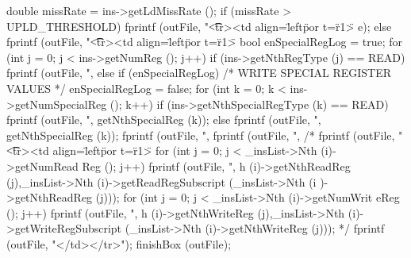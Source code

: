 \begin{DoxyCode}
{{{                        double missRate = ins->getLdMissRate ();
                        if (missRate > UPLD_THRESHOLD)
                                fprintf (outFile, "\t\t<tr><td align=\"left\" por
      t=\"r1\"> %
      e);
                        else {
                                fprintf (outFile, "\t\t<tr><td align=\"left\" por
      t=\"r1\"> %
                bool enSpecialRegLog = true;
                for (int j = 0; j < ins->getNumReg (); j++) {
                    if (ins->getNthRegType (j) == READ) {
                        fprintf (outFile, ",%
                    } else {
                        if (enSpecialRegLog) {
                            /* WRITE SPECIAL REGISTER VALUES */
                            enSpecialRegLog = false;
                            for (int k = 0; k < ins->getNumSpecialReg (); k++) {
                                if (ins->getNthSpecialRegType (k) == READ) {
                                    fprintf (outFile, ",%
      getNthSpecialReg (k));
                                } else {
                                    fprintf (outFile, ",%
      getNthSpecialReg (k));
                                }
                            }
                        }
                        fprintf (outFile, ",%
                    }
                }
                                fprintf (outFile, ",%
/*                              fprintf (outFile, "\t\t<tr><td align=\"left\" por
      t=\"r1\"> %
                                for (int j = 0; j < _insList->Nth (i)->getNumRead
      Reg (); j++) {
                                        fprintf (outFile, ",%
      h (i)->getNthReadReg (j),_insList->Nth (i)->getReadRegSubscript (_insList->Nth (i
      )->getNthReadReg (j)));                         
                                }
                                for (int j = 0; j < _insList->Nth (i)->getNumWrit
      eReg (); j++) {
                                        fprintf (outFile, ",%
      h (i)->getNthWriteReg (j),_insList->Nth (i)->getWriteRegSubscript (_insList->Nth 
      (i)->getNthWriteReg (j)));                              
                                }
*/                              fprintf (outFile, "</td></tr>\n");
                        }
                }
                finishBox (outFile);
        }
}
\end{DoxyCode}


